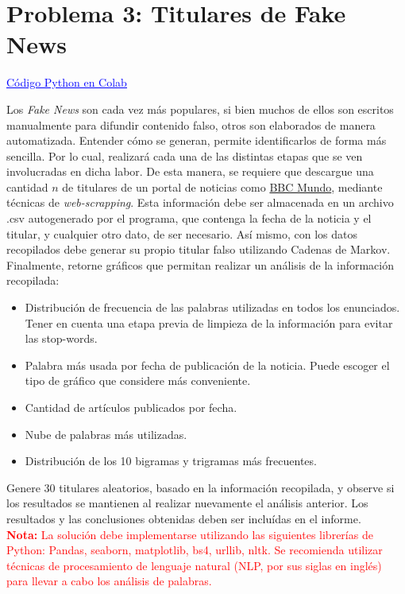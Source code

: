 \section*{Problema 3: Titulares de Fake News}

\href{https://colab.research.google.com/drive/1pzkUeVCaZLZUE1XuvtgFqtPpnPEJiXGV#scrollTo=8aIp4sQG_Eyy}{\textcolor{blue}{\underline{Código Python en Colab}}}

Los \textit{Fake News} son cada vez más populares, si bien muchos de ellos son escritos manualmente para difundir contenido falso, otros son elaborados de manera automatizada. Entender cómo se generan, permite identificarlos de forma más sencilla. Por lo cual, realizará cada una de las distintas etapas que se ven involucradas en dicha labor. 
De esta manera, se requiere que descargue una cantidad $n$ de titulares de un portal de noticias como \textcolor{cyan}{\href{https://www.bbc.com/mundo/topics/c67q9nnn8z7t}{BBC Mundo}}, mediante técnicas de \textit{web-scrapping}. Esta información debe ser almacenada en un archivo .csv autogenerado por el programa, que contenga la fecha de la noticia y el titular, y cualquier otro dato, de ser necesario. Así mismo, con los datos recopilados debe generar su propio titular falso utilizando Cadenas de Markov. Finalmente, retorne gráficos que permitan realizar un análisis de la información recopilada:
\begin{itemize}
    \item Distribución de frecuencia de las palabras utilizadas en todos los enunciados. Tener en cuenta una etapa previa de limpieza de la información para evitar las stop-words.
    \item Palabra más usada por fecha de publicación de la noticia. Puede escoger el tipo de gráfico que considere más conveniente.
    \item Cantidad de artículos publicados por fecha.
    \item Nube de palabras más utilizadas.
    \item Distribución de los 10 bigramas y trigramas más frecuentes.
\end{itemize}
Genere 30 titulares aleatorios, basado en la información recopilada, y observe si los resultados se mantienen al realizar nuevamente el análisis anterior. Los resultados y las conclusiones obtenidas deben ser incluídas en el informe.
\\

\textcolor{red}{\textbf{Nota:} La solución debe implementarse utilizando las siguientes librerías de Python: Pandas, seaborn, matplotlib, bs4, urllib, nltk. Se recomienda utilizar técnicas de procesamiento de lenguaje natural (NLP, por sus siglas en inglés) para llevar a cabo los análisis de palabras.}

